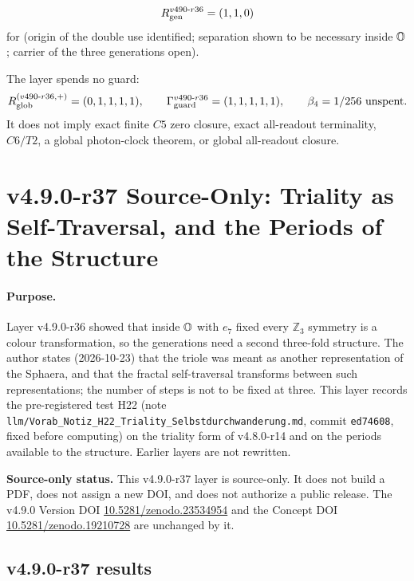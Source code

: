 \[
R_{\rm gen}^{v490\text{-}r36}=(1,1,0)
\]
for (origin of the double use identified; separation shown to be necessary inside \(\mathbb{O}\); carrier of the three generations open).

The layer spends no guard:
\[
R_{\rm glob}^{(v490\text{-}r36,+)}=(0,1,1,1,1),
\qquad
\Gamma_{\rm guard}^{v490\text{-}r36}=(1,1,1,1,1),
\qquad
\beta_4=1/256\ \text{unspent}.
\]
It does not imply exact finite \(C5\) zero closure, exact all-readout terminality,
\(C6/T2\), a global photon-clock theorem, or global all-readout closure.
\clearpage
\section*{v4.9.0-r37 Source-Only: Triality as Self-Traversal, and the Periods of the Structure}
\label{sec:v490-r37-triality-self-traversal}

\paragraph{Purpose.}
Layer v4.9.0-r36 showed that inside \(\mathbb{O}\) with \(e_7\) fixed every \(\mathbb Z_3\) symmetry is a colour transformation, so the
generations need a second three-fold structure.  The author states (2026-10-23) that the triole was meant as another
representation of the Sphaera, and that the fractal self-traversal transforms between such representations; the number of steps
is not to be fixed at three.  This layer records the pre-registered test H22 (note
\texttt{llm/Vorab\_Notiz\_H22\_Triality\_Selbstdurchwanderung.md}, commit \texttt{ed74608}, fixed before computing) on the triality
form of v4.8.0-r14 and on the periods available to the structure.  Earlier layers are not rewritten.

\noindent\textbf{Source-only status.}
This v4.9.0-r37 layer is source-only.  It does not build a PDF, does not assign a new DOI,
and does not authorize a public release.  The v4.9.0 Version DOI
\href{https://doi.org/10.5281/zenodo.23534954}{10.5281/zenodo.23534954} and the Concept DOI
\href{https://doi.org/10.5281/zenodo.19210728}{10.5281/zenodo.19210728} are unchanged by it.

\subsection*{v4.9.0-r37 results}
\label{subsec:v490-r37-results}


